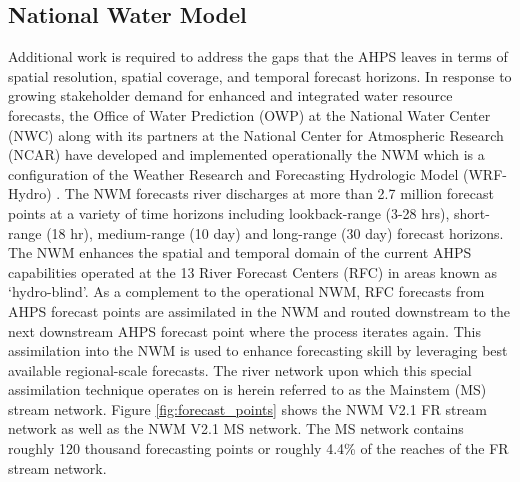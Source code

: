 \documentclass[draft]{dependencies/agujournal2019}
\begin{document}
\subsection{National Water Model}
\label{ssec:national_water_model}
%
Additional work is required to address the gaps that the AHPS leaves in terms of spatial resolution, spatial coverage, and temporal forecast horizons.
In response to growing stakeholder demand for enhanced and integrated water resource forecasts, the Office of Water Prediction (OWP) at the National Water Center (NWC) along with its partners at the National Center for Atmospheric Research (NCAR) have developed and implemented operationally the NWM which is a configuration of the Weather Research and Forecasting Hydrologic Model (WRF-Hydro) \cite{salas2018towards,gochis2021wrf,cosgrove2019evolution}. 
The NWM forecasts river discharges at more than 2.7 million forecast points at a variety of time horizons including lookback-range (3-28 hrs), short-range (18 hr), medium-range (10 day) and long-range (30 day) forecast horizons.
The NWM enhances the spatial and temporal domain of the current AHPS capabilities operated at the 13 River Forecast Centers (RFC) in areas known as `hydro-blind'.
As a complement to the operational NWM, RFC forecasts from AHPS forecast points are assimilated in the NWM and routed downstream to the next downstream AHPS forecast point where the process iterates again.
This assimilation into the NWM is used to enhance forecasting skill by leveraging best available regional-scale forecasts.
The river network upon which this special assimilation technique operates on is herein referred to as the Mainstem (MS) stream network.
Figure \ref{fig:forecast_points} shows the NWM V2.1 FR stream network as well as the NWM V2.1 MS network.
The MS network contains roughly 120 thousand forecasting points or roughly 4.4\% of the reaches of the FR stream network.
\end{document}
